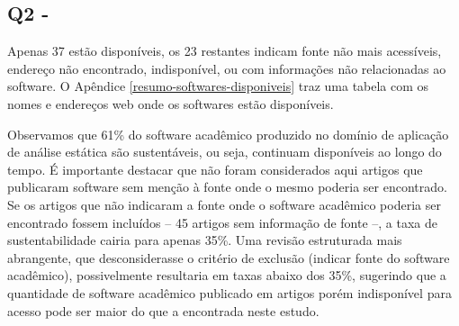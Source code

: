 \subsection{Q2 - \EstudoUmQuestaoDois} %


Apenas 37 estão disponíveis, os 23 restantes indicam fonte não mais
acessíveis, endereço não encontrado, indisponível, ou com informações não
relacionadas ao software. 
O Apêndice \ref{resumo-softwares-disponiveis} traz
uma tabela com os nomes e endereços web onde os softwares estão disponíveis.

Observamos que 61\% do software acadêmico produzido no domínio de aplicação de análise estática 
são sustentáveis, ou seja, continuam disponíveis ao longo do tempo. 
É importante destacar que não foram considerados aqui artigos que publicaram software 
sem menção à fonte onde o mesmo poderia ser encontrado.
Se os artigos que não indicaram a fonte onde o software acadêmico poderia ser encontrado
fossem incluídos -- 45 artigos sem informação de fonte --, 
a taxa de sustentabilidade cairia para apenas 35\%.
Uma revisão estruturada mais abrangente, que desconsiderasse o critério de exclusão
(indicar fonte do software acadêmico), possivelmente resultaria em taxas abaixo dos 35\%, 
sugerindo que a quantidade de software acadêmico publicado em artigos porém indisponível para acesso
pode ser maior do que a encontrada neste estudo.


